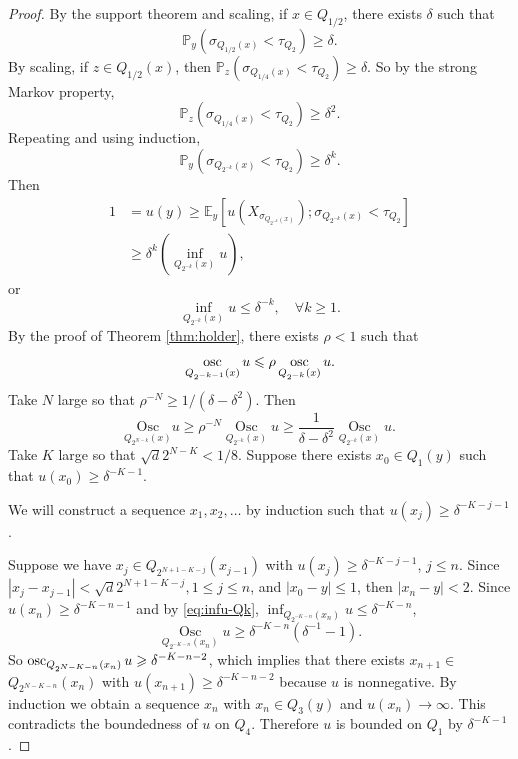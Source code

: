 \begin{proof}
        By the support theorem and scaling, if $x \in Q_{1/2}$, there exists $\delta$ such that 
        \[
            \mathbb{P}_y\left(\sigma_{Q_{1/2}(x)}<\tau_{Q_2}\right) \geq \delta .
        \]
        By scaling, if $z \in Q_{1/2}(x)$, then $\mathbb{P}_z\left(\sigma_{Q_{1/4}(x)}<\tau_{Q_2}\right) \geq \delta$. So by the strong Markov property,
        \[
            \mathbb{P}_z\left(\sigma_{Q_{1/4}(x)}<\tau_{Q_2}\right) \geq \delta^2 .
        \]
        Repeating and using induction,
        \[
            \mathbb{P}_y\left(\sigma_{Q_{2^{-k}}(x)}<\tau_{Q_2}\right) \geq \delta^k .
        \]
        Then
        \[
            \begin{aligned}
                1 & =u(y) \geq \mathbb{E}_y\left[u\left(X_{\sigma_{Q_{2^{-k}}(x)}}\right) ; \sigma_{Q_{2^{-k}}(x)}<\tau_{Q_2}\right] \\
                & \geq \delta^k\left(\inf _{Q_{2^{-k}}(x)} u\right),
            \end{aligned}
        \]
        or 
        \begin{equation}\label{eq:infu-Qk}
            \inf _{Q_{2^{-k}}(x)} u \leq \delta^{-k} , \quad \forall k\geq 1. 
        \end{equation}
        By the proof of Theorem \ref{thm:holder}, there exists $\rho<1$ such that
        \[
             \mathop{{\rm osc}}_{Q_{2^{-k-1}}(x)} u\leqslant \rho \mathop{{\rm osc}}_{Q_{2^{-k}}(x)}u .
        \]
        Take $N$ large so that $\rho^{-N} \geq 1/\left(\delta-\delta^2\right)$.  Then
        \[
            \underset{Q_{2^{N-k}}(x)}{\mathrm{Osc}} u \geq \rho^{-N} \underset{Q_{2^{-k}}(x)}{\operatorname{Osc}} u \geq \frac{1}{\delta-\delta^2} \underset{Q_{2^{-k}}(x)}{\operatorname{Osc}} u .
        \]
        Take $K$ large so that $\sqrt{d} 2^{N-K}<1 / 8$. Suppose there exists $x_0 \in Q_1(y)$ such that $u\left(x_0\right) \geq \delta^{-K-1}$. 
        \begin{framed}
            We will construct a sequence $x_1, x_2, \ldots$ by induction such that $u(x_j)\geq \delta^{-K-j-1}$. 
        \end{framed} Suppose we have $x_j \in Q_{2^{N+1-K-j}}\left(x_{j-1}\right)$ with $u\left(x_j\right) \geq \delta^{-K-j-1}$, $j \leq n$. Since $\left|x_j-x_{j-1}\right|<\sqrt{d} 2^{N+1-K-j}, 1 \leq j \leq n$, and $\left|x_0-y\right| \leq 1$, then $\left|x_n-y\right|<2$. Since $u\left(x_n\right) \geq \delta^{-K-n-1}$ and by  \eqref{eq:infu-Qk}, $\inf _{Q_{2^{-K-n}}(x_n)} u \leq \delta^{-K-n}$, 
        $$
            \underset{Q_{2^{-K-n}}(x_n)}{\operatorname{Osc}} u \geq \delta^{-K-n}\left(\delta^{-1}-1\right) .
        $$
        So $\mathop{{\rm osc}}_{Q_{2^{N-K-n}}(x_n)} u \geqslant \delta^{-K-n-2}$, which implies that there exists $x_{n+1} \in$ $Q_{ 2^{N-K-n}}(x_n)$ with $u\left(x_{n+1}\right) \geq \delta^{-K-n-2}$ because $u$ is nonnegative. By induction we obtain a sequence $x_n$ with $x_n \in Q_3(y)$ and $u\left(x_n\right) \rightarrow \infty$. This contradicts the boundedness of $u$ on $Q_4$. Therefore $u$ is bounded on $Q_1$ by $\delta^{-K-1}$.
    \end{proof}
	
